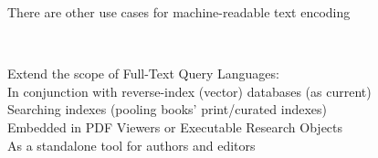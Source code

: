 \begin{frame}{}
{\begin{center}
\begin{minipage}{.9\textwidth}
{\begin{minipage}{\textwidth}
\begin{lightquadblock}{There are other use cases for machine-readable text encoding}
\begin{center}
\begin{minipage}{.99\textwidth}
{\begin{itemize}
{} \\

\sqitem {\lsep} \parbox[t]{17cm}{Extend the scope of Full-Text Query Languages:\vspace{14pt}\\
{\vsps}\hspace*{5pt}{\MyOct}\hspace{-4pt} In conjunction with reverse-index (vector) databases (as current)\\
{\vsps}\hspace*{5pt}{\MyOct}\hspace{-4pt} Searching  indexes (pooling books' print/curated indexes) \\%
{\vsps}\hspace*{5pt}{\MyOct}\hspace{-4pt} Embedded in PDF Viewers or Executable Research Objects \\%
{\vsps}\hspace*{5pt}{\MyOct}\hspace{-4pt} As a standalone tool for authors and editors \\%
} \\

\end{itemize}}\end{minipage}
\vspace{-1em}
\end{center}
\end{lightquadblock}
\end{minipage}}


\end{minipage}
\end{center}
}

\end{frame}

